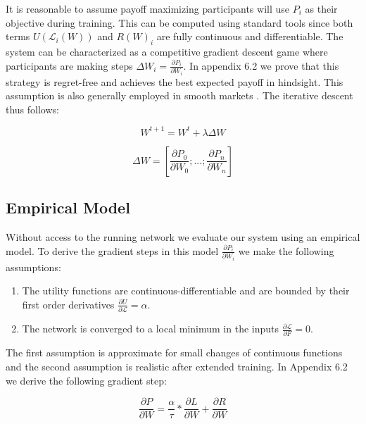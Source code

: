 \documentclass{article}
\begin{document}
It is reasonable to assume payoff maximizing participants will use $P_i$ as their objective during training. This can be computed using standard tools since both terms $U(\mathcal{L}_i(W))$ and $R(W)_i$ are fully continuous and differentiable. The system can be characterized as a competitive gradient descent game where participants are making steps $\Delta W_i = \frac{\partial P_i}{\partial W_i}$. In appendix 6.2 we prove that this strategy is regret-free and achieves the best expected payoff in hindsight. This assumption is also generally employed in smooth markets \cite{balduzzi2020smooth}. The iterative descent thus follows:
\smallskip


\begin{equation}
W^{t+1} = W^{t} + \lambda \Delta W 
\end{equation}
\smallskip


\begin{equation}
\Delta W = [\frac{\partial P_0}{\partial W_0} ; ... ;\frac{\partial P_n}{\partial W_n}]
\end{equation}
\smallskip

\subsection{Empirical Model}

Without access to the running network we evaluate our system using an empirical model. To derive the gradient steps in this model $\frac{\partial P_i}{\partial W_i}$ we make the following assumptions: 

\begin{enumerate}
	\item The utility functions are continuous-differentiable and are bounded by their first order derivatives $\frac{\partial U}{\partial \mathcal{L}} = \alpha$.
	\item  The network is converged to a local minimum in the inputs $\frac{\partial\mathcal{L}}{\partial F} = 0$.
\end{enumerate}  

The first assumption is approximate for small changes of continuous functions and the second assumption is realistic after extended training. In Appendix 6.2 we derive the following gradient step:
\smallskip

\begin{equation}
\frac{\partial P}{\partial W} = \frac{\alpha}{\tau} * \frac{\partial L}{\partial W} + \frac{\partial R}{\partial W}
\end{equation}
\smallskip
\end{document}
